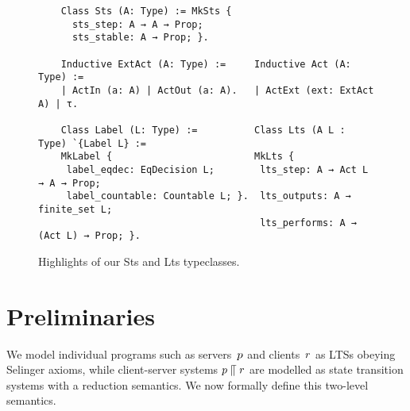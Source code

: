 \begin{figure}[t]
  \hrulefill
  \begin{verbatim}
    Class Sts (A: Type) := MkSts {
      sts_step: A → A → Prop;
      sts_stable: A → Prop; }.

    Inductive ExtAct (A: Type) :=     Inductive Act (A: Type) :=
    | ActIn (a: A) | ActOut (a: A).   | ActExt (ext: ExtAct A) | τ.

    Class Label (L: Type) :=          Class Lts (A L : Type) `{Label L} := 
    MkLabel {                         MkLts {
     label_eqdec: EqDecision L;        lts_step: A → Act L → A → Prop;
     label_countable: Countable L; }.  lts_outputs: A → finite_set L;
                                       lts_performs: A → (Act L) → Prop; }.
  \end{verbatim}
  \caption{Highlights of our Sts and Lts typeclasses.}
  \label{fig:mechanisation-lts}
  \label{fig:sketch-mechanisation-sts}
  \hrulefill
\end{figure}




\section{Preliminaries}
\label{sec:preliminaries}
We model individual programs such as
servers~$p$ and clients~$r$ %
as LTSs obeying Selinger axioms, while client-server systems
$p \mathrel{\llceil} r$ are modelled as state transition systems
with a reduction semantics. We now formally define this two-level
semantics.


